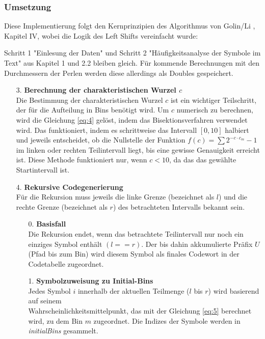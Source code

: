 \documentclass[a4paper,10pt,ngerman]{scrartcl}
\begin{document}
\subsubsection{Umsetzung}
Diese Implementierung folgt den Kernprinzipien des Algorithmus von Golin/Li \cite[Fig. 6 und Kapitel 4]{papergolinli}, Kapitel IV, wobei die Logik des Left Shifts vereinfacht wurde:\\
\newline

Schritt 1 "Einlesung der Daten" und Schritt 2 "Häufigkeitsanalyse der Symbole im Text" aus Kapitel 1 und 2.2 bleiben gleich. Für kommende Berechnungen mit den Durchmessern der Perlen werden diese allerdings als Doubles gespeichert. 
\begin{enumerate}
  \item [3.] \textbf{Berechnung der charakteristischen Wurzel $c$} \\
  Die Bestimmung der charakteristischen Wurzel $c$ ist ein wichtiger Teilschritt, der für die Aufteilung in Bins benötigt wird. Um $c$ numerisch zu berechnen, wird die Gleichung \ref{eq:4} gelöst, indem das Bisektionsverfahren verwendet wird. Das funktioniert, indem es schrittweise das Intervall $[0,10]$ halbiert und jeweils entscheidet, ob die Nullstelle der Funktion $f(c) = \sum 2^{-c \cdot c_m} - 1$ im linken oder rechten Teilintervall liegt, bis eine gewisse Genauigkeit erreicht ist. Diese Methode funktioniert nur, wenn $c<10$, da das das gewählte Startintervall ist.
  \item [4.] \textbf{Rekursive Codegenerierung}\\
  Für die Rekursion muss jeweils die linke Grenze (bezeichnet als $l$) und die rechte Grenze (bezeichnet als $r$) des betrachteten Intervalls bekannt sein. 
  \begin{enumerate}
    \item [0.] \textbf{Basisfall}\\
    Die Rekursion endet, wenn das betrachtete Teilintervall nur noch ein einziges Symbol enthält $(l == r)$. Der bis dahin akkumulierte Präfix $U$ (Pfad bis zum Bin) wird diesem Symbol als finales Codewort in der Codetabelle zugeordnet.
    \item [1.] \textbf{Symbolzuweisung zu Initial-Bins}\\
    Jedes Symbol $i$ innerhalb der aktuellen Teilmenge ($l$ bis $r$) wird basierend auf seinem \\Wahrscheinlichkeitsmittelpunkt, das mit der Gleichung \ref{eq:5} berechnet wird, zu dem Bin $m$ zugeordnet. Die Indizes der Symbole werden in \textit{initialBins} gesammelt. 

\end{enumerate}
\end{enumerate}
\end{document}
